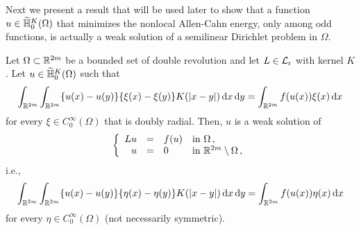 Next we present a result that will be used later to show that a function $u\in \widetilde{\mathbb{H}}^K_{0}(\Omega)$ that minimizes the nonlocal Allen-Cahn energy, only among odd functions, is actually a weak solution of a semilinear Dirichlet problem in $\Omega$.

\begin{proposition}
	\label{Prop:WeakSolutionForAllTestFunctions}
	Let $\Omega \subset \mathbb{R}^{2m}$ be a bounded set of double revolution and let $L\in \mathcal{L}_{\mathrm{r}}$ with kernel $K$. Let $u\in \widetilde{\mathbb{H}}^K_{0}(\Omega)$ such that
	$$
	\int_{\mathbb{R}^{2m}}\int_{\mathbb{R}^{2m}} \{u(x)-u(y)\}\{\xi(x)-\xi(y)\} K(|x-y|) \,\mathrm{d} x \,\mathrm{d} y = \int_{\mathbb{R}^{2m}} f(u(x)) \xi(x) \,\mathrm{d} x
	$$
	for every $\xi \in C^\infty_0(\Omega)$ that is doubly radial. Then, $u$ is a weak solution of
	$$
	\left\{\begin{array}{rcll}
	Lu &=& f(u) & \text{in } \Omega\,,\\
	u &=& 0 & \text{in } \mathbb{R}^{2m}\setminus \Omega\,,
	\end{array} \right.
	$$
	i.e.,
	$$
	\int_{\mathbb{R}^{2m}}\int_{\mathbb{R}^{2m}} \{u(x)-u(y)\}\{\eta(x)-\eta(y)\} K(|x-y|) \,\mathrm{d} x \,\mathrm{d} y = \int_{\mathbb{R}^{2m}} f(u(x)) \eta(x) \,\mathrm{d} x
	$$
	for every $\eta \in C^\infty_0(\Omega)$ (not necessarily symmetric).
\end{proposition}


